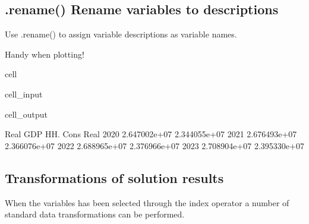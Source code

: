 \documentclass[letterpaper,10pt,english]{jupyterBook}
\begin{document}
\subsection{.rename() Rename variables to descriptions}
\label{\detokenize{content/notebooks/modelflow_features:rename-rename-variables-to-descriptions}}
\sphinxAtStartPar
Use .rename() to assign variable descriptions as variable names.

\sphinxAtStartPar
Handy when plotting!

\begin{sphinxuseclass}{cell}\begin{sphinxVerbatimInput}

\begin{sphinxuseclass}{cell_input}
\begin{sphinxVerbatim}[commandchars=\\\{\}]
\PYG{p}{[}\PYG{p}{]}
\end{sphinxVerbatim}

\end{sphinxuseclass}\end{sphinxVerbatimInput}
\begin{sphinxVerbatimOutput}

\begin{sphinxuseclass}{cell_output}
\begin{sphinxVerbatim}[commandchars=\\\{\}]
          Real GDP  HH. Cons Real
2020  2.647002e+07   2.344055e+07
2021  2.676493e+07   2.366076e+07
2022  2.688965e+07   2.376966e+07
2023  2.708904e+07   2.395330e+07
\end{sphinxVerbatim}

\end{sphinxuseclass}\end{sphinxVerbatimOutput}

\end{sphinxuseclass}

\subsection{Transformations of solution results}
\label{\detokenize{content/notebooks/modelflow_features:transformations-of-solution-results}}
\sphinxAtStartPar
When the variables has been selected through the index operator a number of standard data transformations can be performed.
\end{document}
